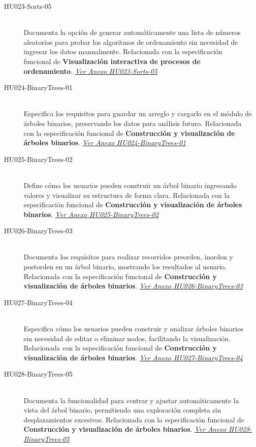 \documentclass[stu, 12pt, letterpaper, donotrepeattitle, floatsintext, natbib]{apa7}
\begin{document}
\begin{description}
    \item[HU023-Sorts-05] \hfill \\
    Documenta la opción de generar automáticamente una lista de números aleatorios para probar los algoritmos de ordenamiento sin necesidad de ingresar los datos manualmente. Relacionada con la especificación funcional de \textbf{Visualización interactiva de procesos de ordenamiento}. \textit{\hyperref[tab:HU023-Sorts-05]{Ver Anexo HU023-Sorts-05}}

    \item[HU024-BinaryTrees-01] \hfill \\
    Especifica los requisitos para guardar un arreglo y cargarlo en el módulo de árboles binarios, preservando los datos para análisis futuro. Relacionada con la especificación funcional de \textbf{Construcción y visualización de árboles binarios}. \textit{\hyperref[tab:HU024-BinaryTrees-01]{Ver Anexo HU024-BinaryTrees-01}}

    \item[HU025-BinaryTrees-02] \hfill \\
    Define cómo los usuarios pueden construir un árbol binario ingresando valores y visualizar su estructura de forma clara. Relacionada con la especificación funcional de \textbf{Construcción y visualización de árboles binarios}. \textit{\hyperref[tab:HU025-BinaryTrees-02]{Ver Anexo HU025-BinaryTrees-02}}

    \item[HU026-BinaryTrees-03] \hfill \\
    Documenta los requisitos para realizar recorridos preorden, inorden y postorden en un árbol binario, mostrando los resultados al usuario. Relacionada con la especificación funcional de \textbf{Construcción y visualización de árboles binarios}. \textit{\hyperref[tab:HU026-BinaryTrees-03]{Ver Anexo HU026-BinaryTrees-03}}
    \item[HU027-BinaryTrees-04] \hfill \\
    Especifica cómo los usuarios pueden construir y analizar árboles binarios sin necesidad de editar o eliminar nodos, facilitando la visualización. Relacionada con la especificación funcional de \textbf{Construcción y visualización de árboles binarios}. \textit{\hyperref[tab:HU027-BinaryTrees-04]{Ver Anexo HU027-BinaryTrees-04}}

    \item[HU028-BinaryTrees-05] \hfill \\
    Documenta la funcionalidad para centrar y ajustar automáticamente la vista del árbol binario, permitiendo una exploración completa sin desplazamientos excesivos. Relacionada con la especificación funcional de \textbf{Construcción y visualización de árboles binarios}. \textit{\hyperref[tab:HU028-BinaryTrees-05]{Ver Anexo HU028-BinaryTrees-05}}


\end{description}
\end{document}
